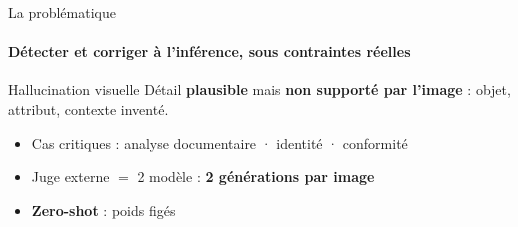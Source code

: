 \begin{frame}{La problématique}
  \framesubtitle{Détecter et corriger à l'inférence, sous contraintes réelles}
  \vspace{0.1cm}
  \centering
  \begin{minipage}{0.88\textwidth}
    \begin{block}{Hallucination visuelle}
      Détail \textbf{plausible} mais \textbf{non supporté par l'image} : objet, attribut, contexte inventé.
    \end{block}
    \vspace{0.45cm}
    \begin{itemize}\setlength{\itemsep}{0.5em}
      \item Cas critiques : analyse documentaire · identité · conformité
      \item Juge externe $=$ 2 modèle : \textbf{2 générations par image}
      \item \textbf{Zero-shot} : poids figés
    \end{itemize}
    \vspace{0.55cm}
  \end{minipage}
\end{frame}
